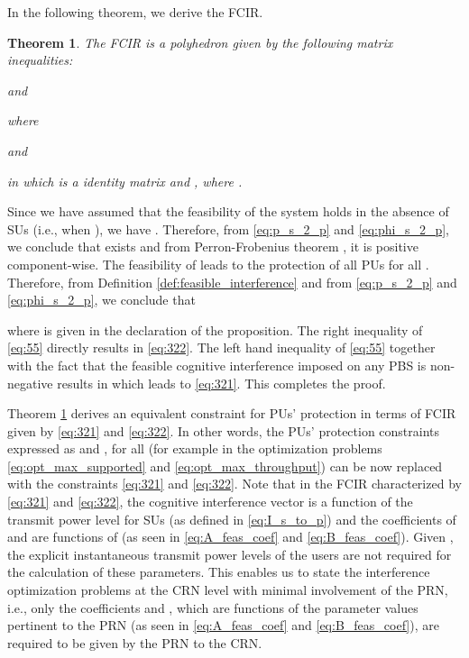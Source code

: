 \documentclass[journal,twoside]{IEEEtran}
\newtheorem {theorem}{Theorem}
\begin{document}
	In the following theorem, we derive the FCIR.
	\begin{theorem}
	\label{th:FCIR}
		The FCIR is a polyhedron given by the following matrix inequalities:

	and
	
		where 
		
		and
		
		in which  is a  identity matrix and ,
		where .
	\end{theorem}
	\begin{IEEEproof}
		Since we have assumed that the feasibility of the system holds in the absence of SUs (i.e., when ), we have . Therefore, from \eqref{eq:p_s_2_p} and \eqref{eq:phi_s_2_p}, we conclude that  exists and from Perron-Frobenius theorem \cite{perron}, it is positive component-wise. The feasibility of  leads to the protection of all PUs for all . Therefore, from Definition \ref{def:feasible_interference} and from \eqref{eq:p_s_2_p} and \eqref{eq:phi_s_2_p}, we conclude that
		
		where  is given in the declaration of the proposition. The right inequality of \eqref{eq:55} directly results in \eqref{eq:322}. The left hand inequality of \eqref{eq:55} together with the fact that the feasible cognitive interference imposed on any PBS is non-negative results in  which leads to \eqref{eq:321}. This completes the proof.
	\end{IEEEproof}
	
	Theorem \ref{th:FCIR} derives an equivalent constraint for PUs' protection in terms of FCIR given by \eqref{eq:321} and \eqref{eq:322}.
	In other words, the PUs' protection constraints expressed as   and , for all  (for example in the optimization problems \eqref{eq:opt_max_supported} and \eqref{eq:opt_max_throughput}) can be now replaced with the constraints \eqref{eq:321} and \eqref{eq:322}. Note that in the FCIR characterized by \eqref{eq:321} and \eqref{eq:322}, the cognitive interference vector  is a function of the transmit power level for SUs (as defined in \eqref{eq:I_s_to_p}) and the coefficients of  and  are functions of  (as seen in \eqref{eq:A_feas_coef} and \eqref{eq:B_feas_coef}). Given , the explicit instantaneous transmit power levels of the users are not required for the calculation of these parameters. This enables us to state the interference optimization problems at the CRN level with minimal involvement of the PRN, i.e., only the coefficients  and , which are functions of the parameter values pertinent to the PRN (as seen in \eqref{eq:A_feas_coef} and \eqref{eq:B_feas_coef}), are required to be given by the PRN to the CRN. 
	
\end{document}

